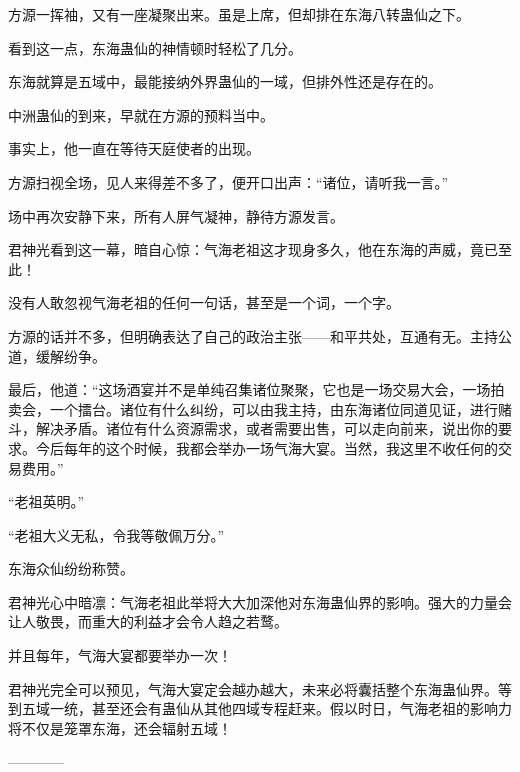 \begin{this_body}
方源一挥袖，又有一座凝聚出来。虽是上席，但却排在东海八转蛊仙之下。

看到这一点，东海蛊仙的神情顿时轻松了几分。

东海就算是五域中，最能接纳外界蛊仙的一域，但排外性还是存在的。

中洲蛊仙的到来，早就在方源的预料当中。

事实上，他一直在等待天庭使者的出现。

方源扫视全场，见人来得差不多了，便开口出声：“诸位，请听我一言。”

场中再次安静下来，所有人屏气凝神，静待方源发言。

君神光看到这一幕，暗自心惊：气海老祖这才现身多久，他在东海的声威，竟已至此！

没有人敢忽视气海老祖的任何一句话，甚至是一个词，一个字。

方源的话并不多，但明确表达了自己的政治主张——和平共处，互通有无。主持公道，缓解纷争。

最后，他道：“这场酒宴并不是单纯召集诸位聚聚，它也是一场交易大会，一场拍卖会，一个擂台。诸位有什么纠纷，可以由我主持，由东海诸位同道见证，进行赌斗，解决矛盾。诸位有什么资源需求，或者需要出售，可以走向前来，说出你的要求。今后每年的这个时候，我都会举办一场气海大宴。当然，我这里不收任何的交易费用。”

“老祖英明。”

“老祖大义无私，令我等敬佩万分。”

东海众仙纷纷称赞。

君神光心中暗凛：气海老祖此举将大大加深他对东海蛊仙界的影响。强大的力量会让人敬畏，而重大的利益才会令人趋之若鹜。

并且每年，气海大宴都要举办一次！

君神光完全可以预见，气海大宴定会越办越大，未来必将囊括整个东海蛊仙界。等到五域一统，甚至还会有蛊仙从其他四域专程赶来。假以时日，气海老祖的影响力将不仅是笼罩东海，还会辐射五域！

------------

\end{this_body}

